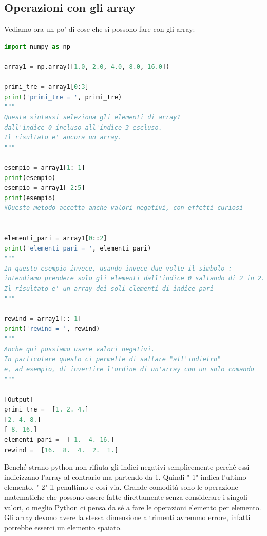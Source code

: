 \documentclass[10pt,a4paper]{article}
\begin{document}
\subsection{Operazioni con gli array}
Vediamo ora un po' di cose che si possono fare con gli array:

\begin{lstlisting}[language=Python]
import numpy as np

array1 = np.array([1.0, 2.0, 4.0, 8.0, 16.0])

primi_tre = array1[0:3]
print('primi_tre = ', primi_tre)
"""
Questa sintassi seleziona gli elementi di array1
dall'indice 0 incluso all'indice 3 escluso.
Il risultato e' ancora un array.
"""

esempio = array1[1:-1]
print(esempio)
esempio = array1[-2:5]
print(esempio)
#Questo metodo accetta anche valori negativi, con effetti curiosi


elementi_pari = array1[0::2]
print('elementi_pari = ', elementi_pari)
"""
In questo esempio invece, usando invece due volte il simbolo :
intendiamo prendere solo gli elementi dall'indice 0 saltando di 2 in 2.
Il risultato e' un array dei soli elementi di indice pari
"""

rewind = array1[::-1]
print('rewind = ', rewind)
"""
Anche qui possiamo usare valori negativi. 
In particolare questo ci permette di saltare "all'indietro" 
e, ad esempio, di invertire l'ordine di un'array con un solo comando
"""

[Output]
primi_tre =  [1. 2. 4.]
[2. 4. 8.]
[ 8. 16.]
elementi_pari =  [ 1.  4. 16.]
rewind =  [16.  8.  4.  2.  1.]
\end{lstlisting}
Benché strano python non rifiuta gli indici negativi semplicemente perché essi indicizzano l'array al contrario ma partendo da 1. Quindi "-1" indica l'ultimo elemento, "-2" il penultimo e così via.
Grande comodità sono le operazione matematiche che possono essere fatte direttamente senza considerare i singoli valori, o meglio Python ci pensa da sé a fare le operazioni elemento per elemento. Gli array devono avere la stessa dimensione altrimenti avremmo errore, infatti potrebbe esserci un elemento spaiato.
\end{document}
